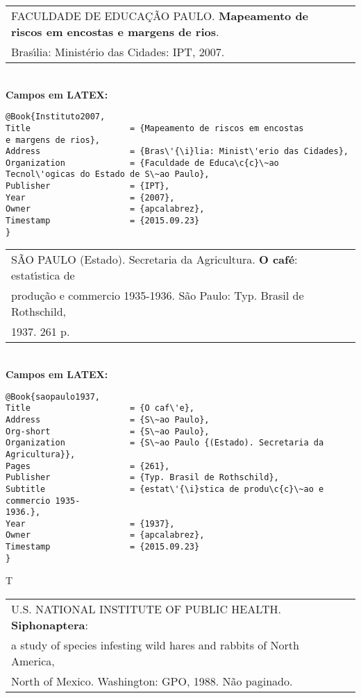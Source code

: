 \begin{tabular}{|l|c|} \hline
	FACULDADE DE EDUCA\c{C}\~AO
	PAULO.  \textbf{Mapeamento de riscos em encostas e margens de rios}. \\ 
	Bras\'{\i}lia: Minist\'erio das Cidades: IPT, 2007.   \\\hline
\end{tabular}\\

\textbf{Campos em LATEX:}

\begin{verbatim}
@Book{Instituto2007,
Title                    = {Mapeamento de riscos em encostas
e margens de rios},
Address                  = {Bras\'{\i}lia: Minist\'erio das Cidades},
Organization             = {Faculdade de Educa\c{c}\~ao
Tecnol\'ogicas do Estado de S\~ao Paulo},
Publisher                = {IPT},
Year                     = {2007},
Owner                    = {apcalabrez},
Timestamp                = {2015.09.23}
}
\end{verbatim}

\begin{tabular}{|l|c|} \hline
	S\~AO PAULO (Estado). Secretaria da Agricultura. \textbf{O caf\'e}: estat\'{\i}stica de \\produ\c{c}\~ao e commercio 1935-1936. S\~ao Paulo: Typ. Brasil de Rothschild, \\1937. 261 p.  \\\hline
\end{tabular}\\

\textbf{Campos em LATEX:}

\begin{verbatim}
@Book{saopaulo1937,
Title                    = {O caf\'e},
Address                  = {S\~ao Paulo},
Org-short                = {S\~ao Paulo},
Organization             = {S\~ao Paulo {(Estado). Secretaria da 
Agricultura}},
Pages                    = {261},
Publisher                = {Typ. Brasil de Rothschild},
Subtitle                 = {estat\'{\i}stica de produ\c{c}\~ao e commercio 1935-
1936.},
Year                     = {1937},
Owner                    = {apcalabrez},
Timestamp                = {2015.09.23}
}
\end{verbatim}
T

\begin{tabular}{|l|c|} \hline
	U.S. NATIONAL INSTITUTE OF PUBLIC HEALTH. \textbf{Siphonaptera}: \\  a study
	of species infesting wild hares and rabbits of North America,\\ North of Mexico. Washington: GPO, 1988. N\~ao paginado.  \\\hline
\end{tabular}\\

